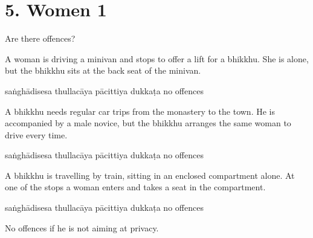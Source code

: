 \chapter{5. Women 1}
\renewcommand*{\theChapterTitle}{5. Women 1}

\begin{exam}{\autoExamName}

\begin{problem*}

Are there offences?

\begin{parts}

\item A woman is driving a minivan and stops to offer a lift for a bhikkhu.
  She is alone, but the bhikkhu sits at the back seat of the minivan.

  \bigskip

  \begin{answers}{5}
    \bChoices
     saṅghādisesa\eAns
     thullacāya\eAns
     pācittiya\eAns
     dukkaṭa\eAns
     no offences\eAns
    \eChoices
  \end{answers}

  \bigskip

\item A bhikkhu needs regular car trips from the monastery to the town. He is
  accompanied by a male novice, but the bhikkhu arranges the same woman to drive
  every time.

  \bigskip

  \begin{answers}{5}
    \bChoices
     saṅghādisesa\eAns
     thullacāya\eAns
     pācittiya\eAns
     dukkaṭa\eAns
     no offences\eAns
    \eChoices
  \end{answers}

  \bigskip

\item A bhikkhu is travelling by train, sitting in an enclosed compartment alone.
  At one of the stops a woman enters and takes a seat in the compartment.

  \bigskip

  \begin{answers}{5}
    \bChoices
     saṅghādisesa\eAns
     thullacāya\eAns
     pācittiya\eAns
     dukkaṭa\eAns
     no offences\eAns
    \eChoices
  \end{answers}

  \begin{solution}
    No offences if he is not aiming at privacy.
  \end{solution}


\end{parts}
\end{problem*}
\end{exam}
